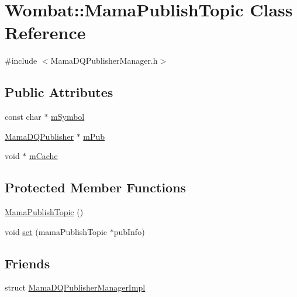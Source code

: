 \hypertarget{classWombat_1_1MamaPublishTopic}{
\section{Wombat::MamaPublishTopic Class Reference}
\label{classWombat_1_1MamaPublishTopic}
}


{\ttfamily \#include $<$MamaDQPublisherManager.h$>$}\subsection*{Public Attributes}
\begin{DoxyCompactItemize}
\item 
const char $\ast$ \hyperlink{classWombat_1_1MamaPublishTopic_ab6c583c703d2c1b238cbeb5952f2f516}{mSymbol}
\item 
\hyperlink{classWombat_1_1MamaDQPublisher}{MamaDQPublisher} $\ast$ \hyperlink{classWombat_1_1MamaPublishTopic_a891079d45abe288278240d319a9d243f}{mPub}
\item 
void $\ast$ \hyperlink{classWombat_1_1MamaPublishTopic_a59240f9b74899a0812c8915b733ae251}{mCache}
\end{DoxyCompactItemize}
\subsection*{Protected Member Functions}
\begin{DoxyCompactItemize}
\item 
\hyperlink{classWombat_1_1MamaPublishTopic_afb52e7ebddc6df6d2d03034ac8f86042}{MamaPublishTopic} ()
\item 
void \hyperlink{classWombat_1_1MamaPublishTopic_aa56db7eac64cd99b6a3d93508e2c4edc}{set} (mamaPublishTopic $\ast$pubInfo)
\end{DoxyCompactItemize}
\subsection*{Friends}
\begin{DoxyCompactItemize}
\item 
struct \hyperlink{classWombat_1_1MamaPublishTopic_af0b94f777c7ff99519ee9a69876f52eb}{MamaDQPublisherManagerImpl}
\end{DoxyCompactItemize}



